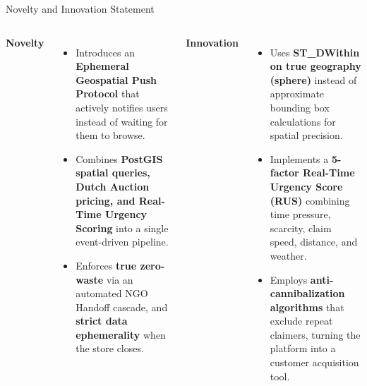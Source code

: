 \documentclass[aspectratio=169,xcolor=dvipsnames]{beamer}
\begin{document}
\begin{frame}{Novelty and Innovation Statement}
\justifying

\begin{columns}[t]


\textbf{Novelty}

\begin{itemize}
    \item Introduces an \textbf{Ephemeral Geospatial Push Protocol} that actively notifies users instead of waiting for them to browse.

    \item Combines \textbf{PostGIS spatial queries, Dutch Auction pricing, and Real-Time Urgency Scoring} into a single event-driven pipeline.

    \item Enforces \textbf{true zero-waste} via an automated NGO Handoff cascade, and \textbf{strict data ephemerality} when the store closes.
\end{itemize}


\textbf{Innovation}

\begin{itemize}
    \item Uses \textbf{ST\_DWithin on true geography (sphere)} instead of approximate bounding box calculations for spatial precision.

    \item Implements a \textbf{5-factor Real-Time Urgency Score (RUS)} combining time pressure, scarcity, claim speed, distance, and weather.

    \item Employs \textbf{anti-cannibalization algorithms} that exclude repeat claimers, turning the platform into a customer acquisition tool.
\end{itemize}

\end{columns}

\end{frame}

\end{document}

